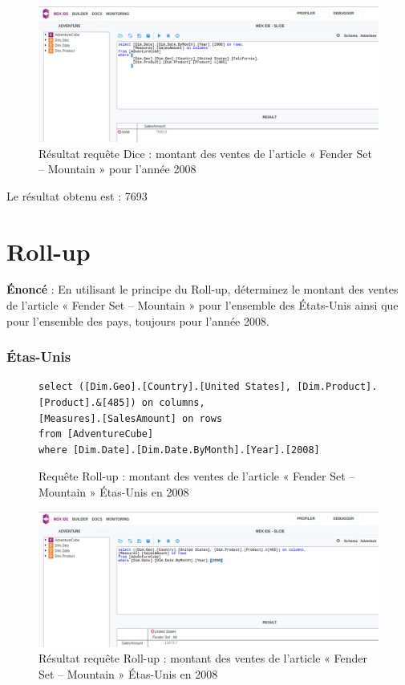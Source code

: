 \begin{figure}[H]
    \centering
    \includegraphics[width=1\linewidth, fbox]{img/requeteDice.png}
    \caption{Résultat requête Dice : montant des ventes de l'article « Fender Set – Mountain » pour l'année 2008}
    \label{reqSliceDice}
\end{figure}

Le résultat obtenu est : 7693

\section{Roll-up}

\textbf{Énoncé} : En utilisant le principe du Roll-up, déterminez le montant des ventes de l’article « Fender Set – Mountain » pour l’ensemble des États-Unis ainsi que pour l’ensemble des pays, toujours pour l’année 2008.

\subsubsection*{Étas-Unis}

\begin{figure}[H]
\centering
\begin{lstlisting}
select ([Dim.Geo].[Country].[United States], [Dim.Product].[Product].&[485]) on columns,
[Measures].[SalesAmount] on rows
from [AdventureCube]
where [Dim.Date].[Dim.Date.ByMonth].[Year].[2008]
\end{lstlisting}
\caption{Requête Roll-up : montant des ventes de l'article « Fender Set – Mountain » Étas-Unis en 2008}
\label{lst:reqRollUpUS}
\end{figure}

\begin{figure}[H]
    \centering
    \includegraphics[width=1\linewidth, fbox]{img/requeteRollUpUS.png}
    \caption{Résultat requête Roll-up : montant des ventes de l'article « Fender Set – Mountain » Étas-Unis en 2008}
    \label{reqRollUpResultUS}
\end{figure}

